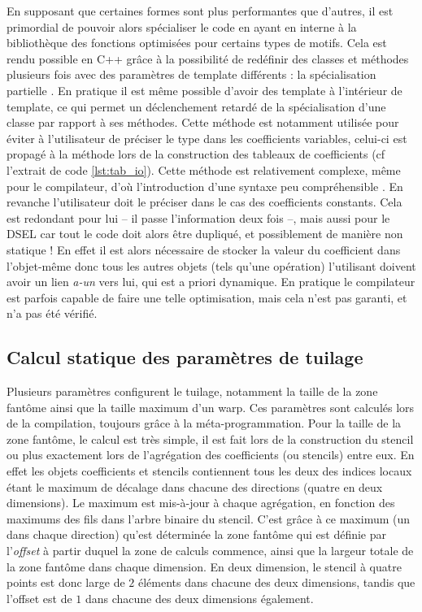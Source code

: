En supposant que certaines formes sont plus performantes que d'autres, il est primordial de pouvoir alors spécialiser le code en ayant en interne à la bibliothèque des fonctions optimisées pour certains types de motifs. Cela est rendu possible en \textsf{C++} grâce à la possibilité de redéfinir des classes et méthodes plusieurs fois avec des paramètres de template différents : la spécialisation partielle \cite{Web1}. En pratique il est même possible d'avoir des template à l'intérieur de template, ce qui permet un déclenchement retardé de la spécialisation d'une classe par rapport à ses méthodes. Cette méthode est notamment utilisée pour éviter à l'utilisateur de préciser le type dans les coefficients variables, celui-ci est propagé à la méthode lors de la construction des tableaux de coefficients (cf l'extrait de code \ref{lst:tab_io}). Cette méthode est relativement complexe, même pour le compilateur, d'où l'introduction d'une syntaxe peu compréhensible \cite{Web2}. En revanche l'utilisateur doit le préciser dans le cas des coefficients constants. Cela est redondant pour lui -- il passe l'information deux fois --, mais aussi pour le DSEL car tout le code doit alors être dupliqué, et possiblement de manière non statique ! En effet il est alors nécessaire de stocker la valeur du coefficient dans l'objet-même donc tous les autres objets (tels qu'une opération) l'utilisant doivent avoir un lien \emph{a-un} vers lui, qui est a priori dynamique. En pratique le compilateur est parfois capable de faire une telle optimisation, mais cela n'est pas garanti, et n'a pas été vérifié.


\subsection{Calcul statique des paramètres de tuilage}
\label{sec:param_tuile}

Plusieurs paramètres configurent le tuilage, notamment la taille de la zone fantôme ainsi que la taille maximum d'un warp. Ces paramètres sont calculés lors de la compilation, toujours grâce à la méta-programmation. Pour la taille de la zone fantôme, le calcul est très simple, il est fait lors de la construction du stencil ou plus exactement lors de l'agrégation des coefficients (ou stencils) entre eux. En effet les objets coefficients et stencils contiennent tous les deux des indices locaux étant le maximum de décalage dans chacune des directions (quatre en deux dimensions). Le maximum est mis-à-jour à chaque agrégation, en fonction des maximums des fils dans l'arbre binaire du stencil. C'est grâce à ce maximum (un dans chaque direction) qu'est déterminée la zone fantôme qui est définie par l'\emph{offset} à partir duquel la zone de calculs commence, ainsi que la largeur totale de la zone fantôme dans chaque dimension. En deux dimension, le stencil à quatre points est donc large de $2$ éléments dans chacune des deux dimensions, tandis que l'offset est de $1$ dans chacune des deux dimensions également.


